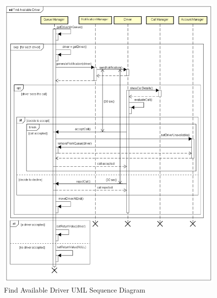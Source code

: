 \documentclass[a4paper]{article}
\begin{document}
\begin{figure}[H]
\includegraphics[width=\sequenceWidth]{Sequence-FindAvailableDriver}
\centering
\caption{Find Available Driver UML Sequence Diagram}
\label{fig:sequencefindavailabledriver}
\end{figure}
\end{document}
